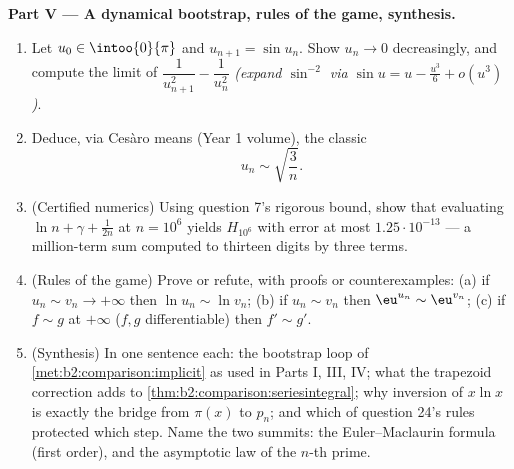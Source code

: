 \begin{problem}
\medskip
\noindent\textbf{Part V --- A dynamical bootstrap, rules of the
game, synthesis.}
\begin{enumerate}[resume]
  \item Let $u_0 \in \intoo{0}{\pi}$ and $u_{n+1} = \sin u_n$.
        Show $u_n \to 0$ decreasingly, and compute the limit of
        $\dfrac{1}{u_{n+1}^2} - \dfrac{1}{u_n^2}$ \emph{(expand
        $\sin^{-2}$ via $\sin u = u - \frac{u^3}6 + o(u^3)$)}.
  \item Deduce, via Ces\`aro means (Year 1 volume), the classic
        \[
        u_n \sim \sqrt{\frac{3}{n}} .
        \]
  \item (Certified numerics) Using question 7's rigorous bound,
        show that evaluating $\ln n + \gamma + \frac1{2n}$ at $n
        = 10^6$ yields $H_{10^6}$ with error at most
        $1.25\cdot10^{-13}$ --- a million-term sum computed to
        thirteen digits by three terms.
  \item (Rules of the game) Prove or refute, with proofs or
        counterexamples: (a) if $u_n \sim v_n \to +\infty$ then
        $\ln u_n \sim \ln v_n$; (b) if $u_n \sim v_n$ then
        $\eu^{u_n} \sim \eu^{v_n}$; (c) if $f \sim g$ at
        $+\infty$ ($f, g$ differentiable) then $f' \sim g'$.
  \item (Synthesis) In one sentence each: the bootstrap loop of
        \cref{met:b2:comparison:implicit} as used in Parts I,
        III, IV; what the trapezoid correction adds to
        \cref{thm:b2:comparison:seriesintegral}; why inversion
        of $x\ln x$ is exactly the bridge from $\pi(x)$ to
        $p_n$; and which of question 24's rules protected which
        step. Name the two summits: the Euler--Maclaurin formula
        (first order), and the asymptotic law of the $n$-th
        prime.
\end{enumerate}
\end{problem}
